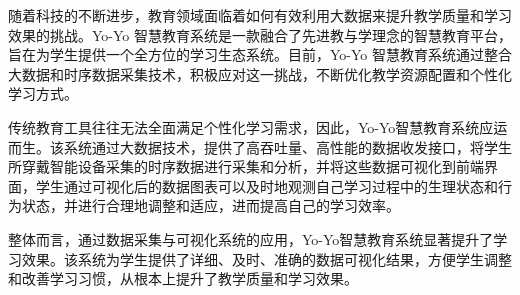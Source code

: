 随着科技的不断进步，教育领域面临着如何有效利用大数据来提升教学质量和学习效果的挑战。Yo-Yo 智慧教育系统是一款融合了先进教与学理念的智慧教育平台，旨在为学生提供一个全方位的学习生态系统。目前，Yo-Yo 智慧教育系统通过整合大数据和时序数据采集技术，积极应对这一挑战，不断优化教学资源配置和个性化学习方式。

传统教育工具往往无法全面满足个性化学习需求，因此，Yo-Yo智慧教育系统应运而生。该系统通过大数据技术，提供了高吞吐量、高性能的数据收发接口，将学生所穿戴智能设备采集的时序数据进行采集和分析，并将这些数据可视化到前端界面，学生通过可视化后的数据图表可以及时地观测自己学习过程中的生理状态和行为状态，并进行合理地调整和适应，进而提高自己的学习效率。

整体而言，通过数据采集与可视化系统的应用，Yo-Yo智慧教育系统显著提升了学习效果。该系统为学生提供了详细、及时、准确的数据可视化结果，方便学生调整和改善学习习惯，从根本上提升了教学质量和学习效果。